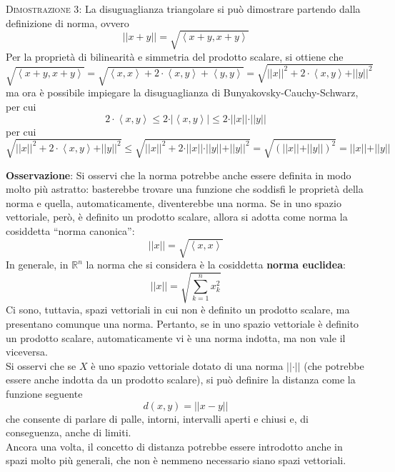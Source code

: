 \documentclass[a4paper]{extarticle}
\newcommand{\quotes}[1]{``#1''}
\begin{document}
\vspace{2em}
\noindent
\normalfont \normalsize
\textsc{Dimostrazione 3}: La disuguaglianza triangolare si può dimostrare partendo dalla definizione di norma, ovvero
\[\vert \vert x+y \vert \vert = \sqrt{\left<x+y,x+y\right>}\]
Per la proprietà di bilinearità e simmetria del prodotto scalare, si ottiene che
\[\sqrt{\left<x+y,x+y\right>} = \sqrt{\left<x,x\right> + 2 \cdot \left<x,y\right> + \left<y,y\right>} = \sqrt{\vert \vert x \vert \vert^2 + 2 \cdot \left<x,y\right> + \vert \vert y \vert \vert^2}\]
ma ora è possibile impiegare la disuguaglianza di Bunyakovsky-Cauchy-Schwarz, per cui
\[2 \cdot \left<x,y\right>  \leq 2 \cdot \vert\left<x,y\right> \vert \leq 2 \cdot \vert \vert x \vert \vert \cdot \vert \vert y \vert \vert\]
per cui
\[\sqrt{\vert \vert x \vert \vert^2 + 2 \cdot \left<x,y\right> + \vert \vert y \vert \vert^2} \leq \sqrt{\vert \vert x \vert \vert^2 + 2 \cdot \vert \vert x \vert \vert \cdot \vert \vert y \vert \vert + \vert \vert y \vert \vert^2} = \sqrt{(\vert \vert x \vert \vert + \vert \vert y \vert \vert)^2} = \vert \vert x \vert \vert + \vert \vert y \vert \vert\]

\vspace{1em}
\noindent
\textbf{Osservazione}: Si osservi che la norma potrebbe anche essere definita in modo molto più astratto: basterebbe trovare una funzione che soddisfi le proprietà della norma e quella, automaticamente, diventerebbe una norma. Se in uno spazio vettoriale, però, è definito un prodotto scalare, allora si adotta come norma la cosiddetta \quotes{norma canonica}:
\[\left \vert \left \vert x \right \vert \right \vert = \sqrt{\left<x,x\right>}\]
In generale, in $\mathbb{R}^n$ la norma che si considera è la cosiddetta \textbf{norma euclidea}:
\[\vert \vert x \vert \vert = \sqrt{\sum_{k=1}^n x_k^2}\]
Ci sono, tuttavia, spazi vettoriali in cui non è definito un prodotto scalare, ma presentano comunque una norma. Pertanto, se in uno spazio vettoriale è definito un prodotto scalare, automaticamente vi è una norma indotta, ma non vale il viceversa.\\
Si osservi che se $X$ è uno spazio vettoriale dotato di una norma $\left \vert \left \vert \cdot \right \vert \right \vert$ (che potrebbe essere anche indotta da un prodotto scalare), si può definire la distanza come la funzione seguente
\[d(x,y) = \left \vert \left \vert x-y \right \vert \right \vert\]
che consente di parlare di palle, intorni, intervalli aperti e chiusi e, di conseguenza, anche di limiti.\\
Ancora una volta, il concetto di distanza potrebbe essere introdotto anche in spazi molto più generali, che non è nemmeno necessario siano spazi vettoriali.
\end{document}
